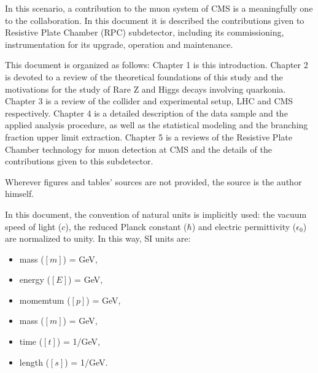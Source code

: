 In this scenario, a contribution to the muon system of CMS is a meaningfully one to the collaboration. In this document it is described the contributions given to Resistive Plate Chamber (RPC) subdetector, including its commissioning, instrumentation for its upgrade, operation and maintenance.

This document is organized as follows: Chapter 1 is this introduction. Chapter 2 is devoted to a review of the theoretical foundations of this study and the motivations for the study of Rare Z and Higgs decays involving quarkonia. Chapter 3 is a review of the collider and experimental setup, LHC and CMS respectively. Chapter 4 is a detailed description of the data sample and the applied analysis procedure, as well as the statistical modeling and the branching fraction upper limit extraction. Chapter 5 is a reviews of the Resistive Plate Chamber technology for muon detection at CMS and the details of the contributions given to this subdetector.

Wherever figures and tables' sources are not provided, the source is the author himself.

In this document, the convention of natural units is implicitly used: the vacuum speed of light ($c$), the reduced Planck constant ($\hbar$) and electric permittivity ($\epsilon_{0}$) are normalized to unity. In this way, SI units are:
\begin{itemize}
    \setlength\itemsep{-0.5em}
    \item mass ($[m]$) = GeV,
    \item energy ($[E]$) = GeV,
    \item momemtum ($[p]$) = GeV,
    \item mass ($[m]$) = GeV,
    \item time ($[t]$) = 1/GeV,
    \item length ($[s]$) = 1/GeV.
\end{itemize}